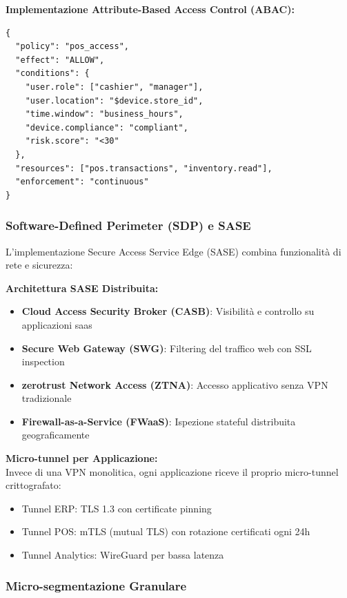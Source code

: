\textbf{Implementazione Attribute-Based Access Control (ABAC):}
\begin{lstlisting}[caption={Policy ABAC per accesso POS},label={lst:abac_policy}]
{
  "policy": "pos_access",
  "effect": "ALLOW",
  "conditions": {
    "user.role": ["cashier", "manager"],
    "user.location": "$device.store_id",
    "time.window": "business_hours",
    "device.compliance": "compliant",
    "risk.score": "<30"
  },
  "resources": ["pos.transactions", "inventory.read"],
  "enforcement": "continuous"
}
\end{lstlisting}

\subsubsection{\texorpdfstring{Software-Defined Perimeter (SDP) e SASE}{3.5.1.2 - Software-Defined Perimeter (SDP) e SASE}}

L'implementazione Secure Access Service Edge (SASE) combina funzionalità di rete e sicurezza:

\textbf{Architettura SASE Distribuita:}
\begin{itemize}
    \item \textbf{Cloud Access Security Broker (CASB)}: Visibilità e controllo su applicazioni \gls{saas}
    \item \textbf{Secure Web Gateway (SWG)}: Filtering del traffico web con SSL inspection
    \item \textbf{\gls{zerotrust} Network Access (ZTNA)}: Accesso applicativo senza VPN tradizionale
    \item \textbf{Firewall-as-a-Service (FWaaS)}: Ispezione stateful distribuita geograficamente
\end{itemize}

\textbf{Micro-tunnel per Applicazione:}\\
Invece di una VPN monolitica, ogni applicazione riceve il proprio micro-tunnel crittografato:
\begin{itemize}
    \item Tunnel ERP: TLS 1.3 con certificate pinning
    \item Tunnel POS: mTLS (mutual TLS) con rotazione certificati ogni 24h
    \item Tunnel Analytics: WireGuard per bassa latenza
\end{itemize}

\subsubsection{\texorpdfstring{Micro-segmentazione Granulare}{3.5.1.3 - Micro-segmentazione Granulare}}

